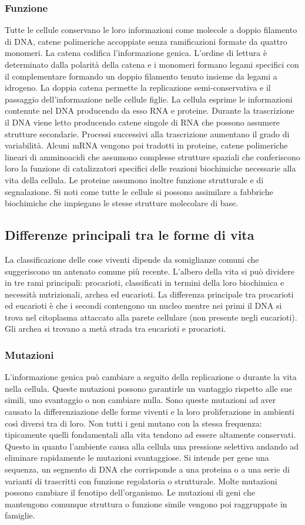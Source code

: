 \subsubsection{Funzione}
Tutte le cellule conservano le loro informazioni come molecole a doppio filamento di DNA, catene polimeriche accoppiate senza ramificazioni formate da quattro monomeri. La catena
codifica l'informazione genica. L'ordine di lettura \`e determinato dalla polarit\`a della catena e i monomeri formano legami specifici con il complementare formando un doppio filamento
tenuto insieme da legami a idrogeno. La doppia catena permette la replicazione semi-conservativa e il passaggio dell'informazione nelle cellule figlie. La cellula esprime le informazioni
contenute nel DNA producendo da esso RNA e proteine. Durante la trascrizione il DNA viene letto producendo catene singole di RNA che possono assumere strutture secondarie. Processi
successivi alla trascrizione aumentano il grado di variabilit\`a. Alcuni mRNA vengono poi tradotti in proteine, catene polimeriche lineari di amminoacidi che assumono complesse strutture
spaziali che conferiscono loro la funzione di catalizzatori specifici delle reazioni biochimiche necessarie alla vita della cellula. Le proteine assumono inoltre funzione strutturale e 
di segnalazione. Si noti come tutte le cellule si possono assimilare a fabbriche biochimiche che impiegano le stesse strutture molecolare di base. 
\subsection{Differenze principali tra le forme di vita}
La classificazione delle cose viventi dipende da somiglianze comuni che suggeriscono un antenato comune pi\`u recente. L'albero della vita si pu\`o dividere in tre rami principali: 
procarioti, classificati in termini della loro biochimica e necessit\`a nutrizionali, archea ed eucarioti. La differenza principale tra procarioti ed eucarioti \`e che i secondi 
contengono un nucleo mentre nei primi il DNA si trova nel citoplasma attaccato alla parete cellulare (non presente negli eucarioti). Gli archea si trovano a met\`a strada tra eucarioti
e procarioti. 
\subsubsection{Mutazioni}
L'informazione genica pu\`o cambiare a seguito della replicazione o durante la vita nella cellula. Queste mutazioni possono garantirle un vantaggio rispetto alle sue simili, uno 
svantaggio o non cambiare nulla. Sono queste mutazioni ad aver causato la differenziazione delle forme viventi e la loro proliferazione in ambienti cos\`i diversi tra di loro. Non tutti 
i geni mutano con la stessa frequenza: tipicamente quelli fondamentali alla vita tendono ad essere altamente conservati. Questo in quanto l'ambiente causa alla cellula una pressione 
selettiva andando ad eliminare rapidamente le mutazioni svantaggiose. Si intende per gene una sequenza, un segmento di DNA che corrisponde a una proteina o a una serie di varianti di 
trascritti con funzione regolatoria o strutturale. Molte mutazioni possono cambiare il fenotipo dell'organismo. Le mutazioni di geni che mantengono comunque struttura o funzione simile
vengono poi raggruppate in famiglie. 
